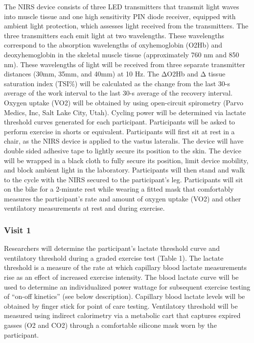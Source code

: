 \documentclass[
]{book}
\begin{document}
The NIRS device consists of three LED transmitters that transmit light waves into muscle tissue and one high sensitivity PIN diode receiver, equipped with ambient light protection, which assesses light received from the transmitters. The three transmitters each emit light at two wavelengths. These wavelengths correspond to the absorption wavelengths of oxyhemoglobin (O2Hb) and deoxyhemoglobin in the skeletal muscle tissue (approximately 760 nm and 850 nm). These wavelengths of light will be received from three separate transmitter distances (30mm, 35mm, and 40mm) at 10 Hz. The ΔO2Hb and Δ tissue saturation index (TSI\%) will be calculated as the change from the last 30-s average of the work interval to the last 30-s average of the recovery interval. Oxygen uptake (VO2) will be obtained by using open-circuit spirometry (Parvo Medics, Inc, Salt Lake City, Utah). Cycling power will be determined via lactate threshold curves generated for each participant.
Participants will be asked to perform exercise in shorts or equivalent. Participants will first sit at rest in a chair, as the NIRS device is applied to the vastus lateralis. The device will have double sided adhesive tape to lightly secure its position to the skin. The device will be wrapped in a black cloth to fully secure its position, limit device mobility, and block ambient light in the laboratory. Participants will then stand and walk to the cycle with the NIRS secured to the participant's leg. Participants will sit on the bike for a 2-minute rest while wearing a fitted mask that comfortably measures the participant's rate and amount of oxygen uptake (VO2) and other ventilatory measurements at rest and during exercise.

\hypertarget{Appendix-IRB-Protocol-StudyProtocol-Visit1}{%
\subsubsection{Visit 1}\label{Appendix-IRB-Protocol-StudyProtocol-Visit1}}

Researchers will determine the participant's lactate threshold curve and ventilatory threshold during a graded exercise test (Table 1). The lactate threshold is a measure of the rate at which capillary blood lactate measurements rise as an effect of increased exercise intensity. The blood lactate curve will be used to determine an individualized power wattage for subsequent exercise testing of ``on-off kinetics'' (see below description). Capillary blood lactate levels will be obtained by finger stick for point of care testing. Ventilatory threshold will be measured using indirect calorimetry via a metabolic cart that captures expired gasses (O2 and CO2) through a comfortable silicone mask worn by the participant.
\end{document}
